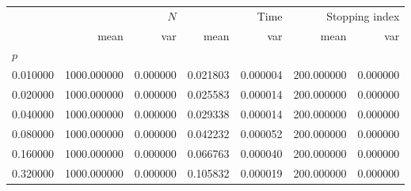 \begin{tabular}{lrrrrrr}
\toprule
 & \multicolumn{2}{r}{$N$} & \multicolumn{2}{r}{Time} & \multicolumn{2}{r}{Stopping index} \\
 & mean & var & mean & var & mean & var \\
$p$ &  &  &  &  &  &  \\
\midrule
0.010000 & 1000.000000 & 0.000000 & 0.021803 & 0.000004 & 200.000000 & 0.000000 \\
0.020000 & 1000.000000 & 0.000000 & 0.025583 & 0.000014 & 200.000000 & 0.000000 \\
0.040000 & 1000.000000 & 0.000000 & 0.029338 & 0.000014 & 200.000000 & 0.000000 \\
0.080000 & 1000.000000 & 0.000000 & 0.042232 & 0.000052 & 200.000000 & 0.000000 \\
0.160000 & 1000.000000 & 0.000000 & 0.066763 & 0.000040 & 200.000000 & 0.000000 \\
0.320000 & 1000.000000 & 0.000000 & 0.105832 & 0.000019 & 200.000000 & 0.000000 \\
\bottomrule
\end{tabular}
